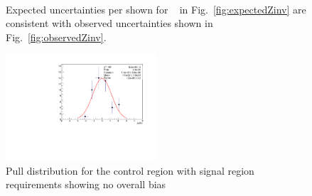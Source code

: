 \begin{figure}[h!]
  \centering
  ~~
  \\
  \caption{\label{fig:expectedObservedZinv}Expected uncertainties per \GeV shown for \zInv~ in Fig.~\ref{fig:expectedZinv} are consistent
  with observed uncertainties shown in Fig.~\ref{fig:observedZinv}.}
\end{figure}

\begin{figure}[]
  \centering
  \includegraphics[width=0.5\textwidth]{figures/template/pullAtMu.pdf}
  \caption{\label{fig:pullAt} Pull distribution for
  the \mj control region with signal region \alt requirements showing no overall bias}
\end{figure}

